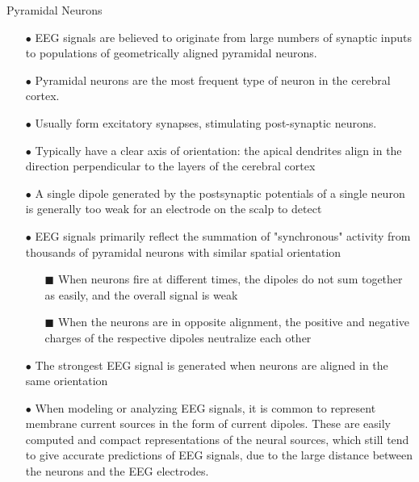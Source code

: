 \documentclass[aspectratio=169, 9pt]{beamer}
\begin{document}
\begin{frame}{Pyramidal Neurons}
    \begin{itemize}
      \item[$\bullet$] EEG signals are believed to originate from large numbers of synaptic inputs to populations of geometrically aligned pyramidal neurons.

      \item[$\bullet$] Pyramidal neurons are the most frequent type of neuron in the cerebral cortex.

      \item[$\bullet$] Usually form excitatory synapses, stimulating post-synaptic neurons.

      \item[$\bullet$] Typically have a clear axis of orientation: the apical dendrites align in the direction perpendicular to the layers of the cerebral cortex

      \item[$\bullet$] A single dipole generated by the postsynaptic potentials of a single neuron is generally too weak for an electrode on the scalp to detect

      \item[$\bullet$] EEG signals primarily reflect the summation of "synchronous" activity from thousands of pyramidal neurons with similar spatial orientation
      \begin{itemize}
        \item[\tiny$\blacksquare$] When neurons fire at different times, the dipoles do not sum together as easily, and the overall signal is weak
        \item[\tiny$\blacksquare$] When the neurons are in opposite alignment, the positive and negative charges of the respective dipoles neutralize each other
      \end{itemize}

      \item[$\bullet$] The strongest EEG signal is generated when neurons are aligned in the same orientation

      \item[$\bullet$] When modeling or analyzing EEG signals, it is common to represent membrane current sources in the form of current dipoles. These are easily computed and compact representations of the neural sources, which still tend to give accurate predictions of EEG signals, due to the large distance between the neurons and the EEG electrodes.
    \end{itemize}
\end{frame}
\end{document}

